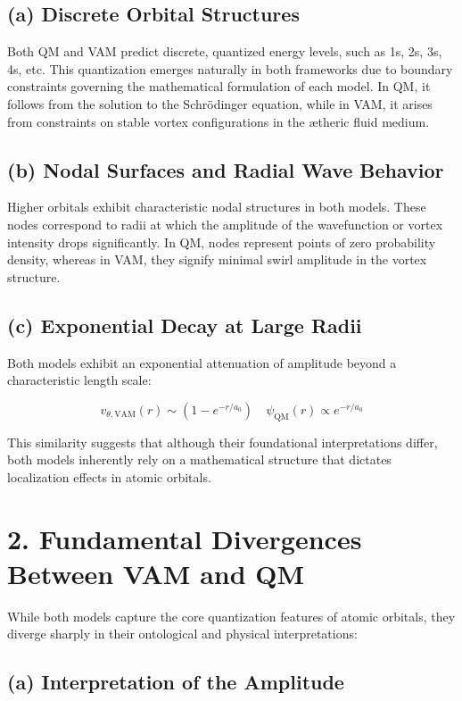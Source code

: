 \documentclass[a4paper,10pt]{article}
\begin{document}
\subsection*{(a) Discrete Orbital Structures}

Both QM and VAM predict discrete, quantized energy levels, such as 1s, 2s, 3s, 4s, etc. This quantization emerges naturally in both frameworks due to boundary constraints governing the mathematical formulation of each model. In QM, it follows from the solution to the Schrödinger equation, while in VAM, it arises from constraints on stable vortex configurations in the ætheric fluid medium.

\subsection*{(b) Nodal Surfaces and Radial Wave Behavior}

Higher orbitals exhibit characteristic nodal structures in both models. These nodes correspond to radii at which the amplitude of the wavefunction or vortex intensity drops significantly. In QM, nodes represent points of zero probability density, whereas in VAM, they signify minimal swirl amplitude in the vortex structure.

\subsection*{(c) Exponential Decay at Large Radii}

Both models exhibit an exponential attenuation of amplitude beyond a characteristic length scale:

\[
    v_{\theta, \text{VAM}}(r) \sim \left(1 - e^{-r/a_0}\right) \quad \psi_\text{QM}(r) \propto e^{-r/a_0}
\]

This similarity suggests that although their foundational interpretations differ, both models inherently rely on a mathematical structure that dictates localization effects in atomic orbitals.

\section*{2. Fundamental Divergences Between VAM and QM}

While both models capture the core quantization features of atomic orbitals, they diverge sharply in their ontological and physical interpretations:

\subsection*{(a) Interpretation of the Amplitude}
\end{document}
